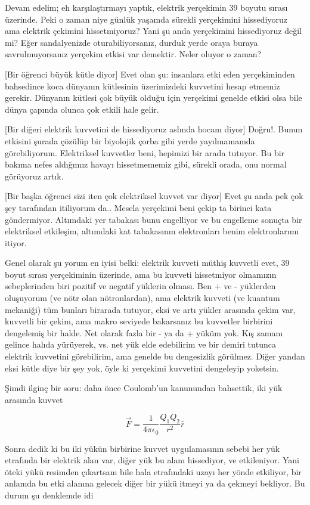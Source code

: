 \documentclass[12pt,fleqn]{article}\usepackage{../../common}
\begin{document}
Devam edelim; eh karşılaştırmayı yaptık, elektrik yerçekimin 39 boyutu
sırası üzerinde. Peki o zaman niye günlük yaşamda sürekli yerçekimini
hissediyoruz ama elektrik çekimini hissetmiyoruz? Yani şu anda yerçekimini
hissediyoruz değil mi?  Eğer sandalyenizde oturabiliyorsanız, durduk yerde
oraya buraya savrulmuyorsanız yerçekim etkisi var demektir. Neler oluyor o
zaman?

[Bir öğrenci büyük kütle diyor] Evet olan şu: insanlara etki eden
yerçekiminden bahsedince koca dünyanın kütlesinin üzerimizdeki kuvvetini
hesap etmemiz gerekir. Dünyanın kütlesi çok büyük olduğu için yerçekimi
genelde etkisi olsa bile dünya çapında olunca çok etkili hale gelir.

[Bir diğeri elektrik kuvvetini de hissediyoruz aslında hocam diyor]
Doğru!. Bunun etkisini şurada çözülüp bir biyolojik çorba gibi yerde
yayılmamamda görebiliyorum. Elektriksel kuvvetler beni, hepimizi bir arada
tutuyor. Bu bir bakıma nefes aldığımız havayı hissetmememiz gibi, sürekli
orada, onu normal görüyoruz artık.

[Bir başka öğrenci sizi iten çok elektriksel kuvvet var diyor] Evet şu anda
pek çok şey tarafından itiliyorum da.. Mesela yerçekimi beni çekip ta
birinci kata göndermiyor. Altımdaki yer tabakası bunu engelliyor ve bu
engelleme sonuçta bir elektriksel etkileşim, altımdaki kat tabakasının
elektronları benim elektronlarımı itiyor.

Genel olarak şu yorum en iyisi belki: elektrik kuvveti müthiş kuvvetli
evet, 39 boyut sırası yerçekiminin üzerinde, ama bu kuvveti hissetmiyor
olmamızın sebeplerinden biri pozitif ve negatif yüklerin olması. Ben + ve -
yüklerden oluşuyorum (ve nötr olan nötronlardan), ama elektrik kuvveti (ve
kuantum mekaniği) tüm bunları birarada tutuyor, eksi ve artı yükler
arasında çekim var, kuvvetli bir çekim, ama makro seviyede bakarsanız bu
kuvvetler birbirini dengelemiş bir halde. Net olarak fazla bir - ya da +
yüküm yok. Kış zamanı gelince halıda yürüyerek, vs. net yük elde edebilirim
ve bir demiri tutunca elektrik kuvvetini görebilirim, ama genelde bu
dengesizlik görülmez. Diğer yandan eksi kütle diye bir şey yok, öyle ki
yerçekimi kuvvetini dengeleyip yoketsin.

Şimdi ilginç bir soru: daha önce Coulomb'un kanunundan bahsettik, iki yük
arasında kuvvet

$$ \vec{F} = \frac{1}{4\pi \epsilon_0} \frac{Q_1 Q_2}{r^2} \hat{r}$$

Sonra dedik ki bu iki yükün birbirine kuvvet uygulamasının sebebi her yük
etrafında bir elektrik alan var, diğer yük bu alanı hissediyor, ve
etkileniyor. Yani öteki yükü resimden çıkartsam bile hala etrafındaki uzayı
her yönde etkiliyor, bir anlamda bu etki alanına gelecek diğer bir yükü
itmeyi ya da çekmeyi bekliyor. Bu durum şu denklemde idi
\end{document}
